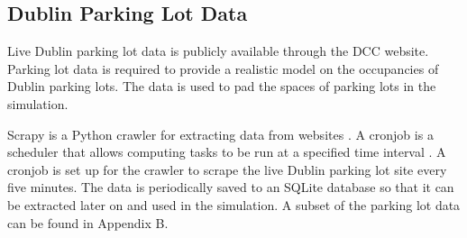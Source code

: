 \pagebreak

\subsection{Dublin Parking Lot Data}\label{data:parking_lot}
Live Dublin parking lot data is publicly available through the \ac{DCC} website. Parking lot data is required to provide a realistic model on the occupancies of Dublin parking lots. The data is used to pad the spaces of parking lots in the simulation.

Scrapy is a Python crawler for extracting data from websites \citep{2017ScrapyCrawler}. A cronjob is a scheduler that allows computing tasks to be run at a specified time interval \citep{2017CronTabDocumentation}. A cronjob is set up for the crawler to scrape the live Dublin parking lot site every five minutes. The data is periodically saved to an SQLite database so that it can be extracted later on and used in the simulation. A subset of the parking lot data can be found in Appendix B.